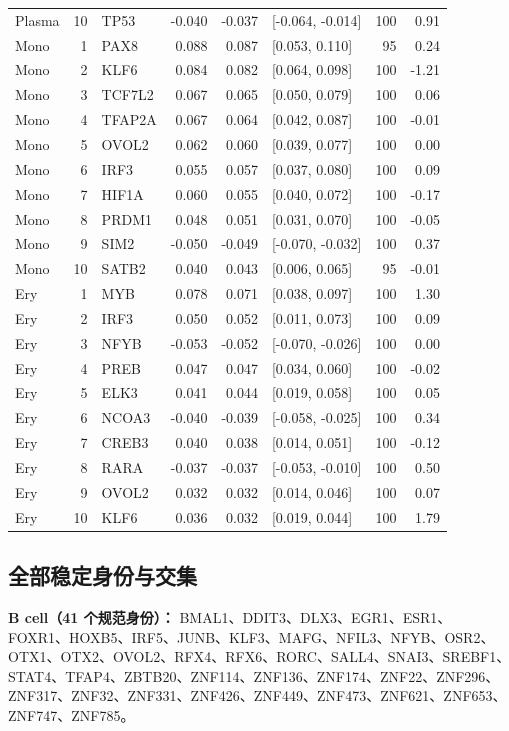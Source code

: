 {\begin{longtable}{lrlrrlrr}
Plasma & 10 & TP53 & -0.040 & -0.037 & [-0.064, -0.014] & 100 & 0.91\\
Mono & 1 & PAX8 & 0.088 & 0.087 & [0.053, 0.110] & 95 & 0.24\\
Mono & 2 & KLF6 & 0.084 & 0.082 & [0.064, 0.098] & 100 & -1.21\\
Mono & 3 & TCF7L2 & 0.067 & 0.065 & [0.050, 0.079] & 100 & 0.06\\
Mono & 4 & TFAP2A & 0.067 & 0.064 & [0.042, 0.087] & 100 & -0.01\\
Mono & 5 & OVOL2 & 0.062 & 0.060 & [0.039, 0.077] & 100 & 0.00\\
Mono & 6 & IRF3 & 0.055 & 0.057 & [0.037, 0.080] & 100 & 0.09\\
Mono & 7 & HIF1A & 0.060 & 0.055 & [0.040, 0.072] & 100 & -0.17\\
Mono & 8 & PRDM1 & 0.048 & 0.051 & [0.031, 0.070] & 100 & -0.05\\
Mono & 9 & SIM2 & -0.050 & -0.049 & [-0.070, -0.032] & 100 & 0.37\\
Mono & 10 & SATB2 & 0.040 & 0.043 & [0.006, 0.065] & 95 & -0.01\\
Ery & 1 & MYB & 0.078 & 0.071 & [0.038, 0.097] & 100 & 1.30\\
Ery & 2 & IRF3 & 0.050 & 0.052 & [0.011, 0.073] & 100 & 0.09\\
Ery & 3 & NFYB & -0.053 & -0.052 & [-0.070, -0.026] & 100 & 0.00\\
Ery & 4 & PREB & 0.047 & 0.047 & [0.034, 0.060] & 100 & -0.02\\
Ery & 5 & ELK3 & 0.041 & 0.044 & [0.019, 0.058] & 100 & 0.05\\
Ery & 6 & NCOA3 & -0.040 & -0.039 & [-0.058, -0.025] & 100 & 0.34\\
Ery & 7 & CREB3 & 0.040 & 0.038 & [0.014, 0.051] & 100 & -0.12\\
Ery & 8 & RARA & -0.037 & -0.037 & [-0.053, -0.010] & 100 & 0.50\\
Ery & 9 & OVOL2 & 0.032 & 0.032 & [0.014, 0.046] & 100 & 0.07\\
Ery & 10 & KLF6 & 0.036 & 0.032 & [0.019, 0.044] & 100 & 1.79\\
\bottomrule\end{longtable}}
\clearpage\subsection{全部稳定身份与交集}
\noindent\textbf{B cell（41 个规范身份）：} BMAL1、DDIT3、DLX3、EGR1、ESR1、FOXR1、HOXB5、IRF5、JUNB、KLF3、MAFG、NFIL3、NFYB、OSR2、OTX1、OTX2、OVOL2、RFX4、RFX6、RORC、SALL4、SNAI3、SREBF1、STAT4、TFAP4、ZBTB20、ZNF114、ZNF136、ZNF174、ZNF22、ZNF296、ZNF317、ZNF32、ZNF331、ZNF426、ZNF449、ZNF473、ZNF621、ZNF653、ZNF747、ZNF785。\par\medskip
